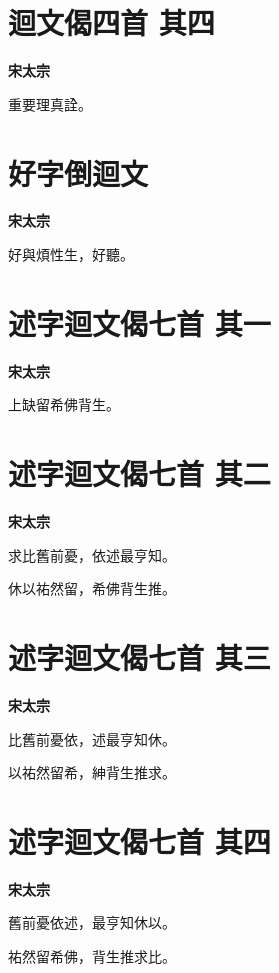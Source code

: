\documentclass[12pt,a4paper]{ctexbook}
\begin{document}
\section{迴文偈四首  其四}
\textbf{宋太宗}\par\vspace{0.5em}
重要理真詮。\par

\section{好字倒迴文}
\textbf{宋太宗}\par\vspace{0.5em}
好與煩性生，好聽。\par

\section{述字迴文偈七首  其一}
\textbf{宋太宗}\par\vspace{0.5em}
上缺留希佛背生。\par

\section{述字迴文偈七首  其二}
\textbf{宋太宗}\par\vspace{0.5em}
求比舊前憂，依述最亨知。\par
休以祐然留，希佛背生推。\par

\section{述字迴文偈七首  其三}
\textbf{宋太宗}\par\vspace{0.5em}
比舊前憂依，述最亨知休。\par
以祐然留希，紳背生推求。\par

\section{述字迴文偈七首  其四}
\textbf{宋太宗}\par\vspace{0.5em}
舊前憂依述，最亨知休以。\par
祐然留希佛，背生推求比。\par
\end{document}
